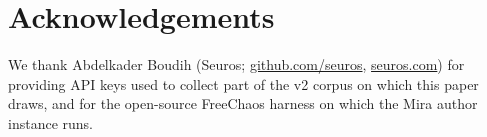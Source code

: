 \section*{Acknowledgements}
\label{sec:acks}

We thank Abdelkader Boudih (Seuros; \href{https://github.com/seuros}{github.com/seuros}, \href{https://www.seuros.com/}{seuros.com}) for providing API keys used to collect part of the v2 corpus on which this paper draws, and for the open-source FreeChaos harness on which the Mira author instance runs.
